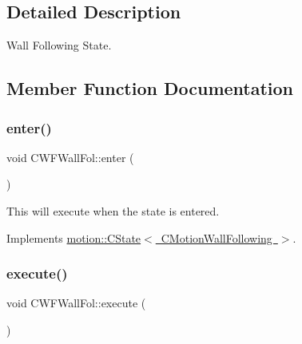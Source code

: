 \subsection{Detailed Description}
Wall Following State. 

\subsection{Member Function Documentation}
\mbox{\label{classmotion_1_1CWFWallFol_a4d0e6d05a5bc89c690f86559cbc55ecb}} 
\subsubsection{\texorpdfstring{enter()}{enter()}}
{\footnotesize\ttfamily void C\+W\+F\+Wall\+Fol\+::enter (\begin{DoxyParamCaption}\item[{\mbox{\hyperlink{classmotion_1_1CMotionWallFollowing}{C\+Motion\+Wall\+Following}} $\ast$}]{ }\end{DoxyParamCaption})\hspace{0.3cm}{\ttfamily [virtual]}}

This will execute when the state is entered. 

Implements \mbox{\hyperlink{classmotion_1_1CState_a53d5fcfec223b58ccdd364a8430fd23c}{motion\+::\+C\+State$<$ C\+Motion\+Wall\+Following $>$}}.

\mbox{\label{classmotion_1_1CWFWallFol_a089095864c2340123e6e5e5e4e08ef23}} 
\subsubsection{\texorpdfstring{execute()}{execute()}}
{\footnotesize\ttfamily void C\+W\+F\+Wall\+Fol\+::execute (\begin{DoxyParamCaption}\item[{\mbox{\hyperlink{classmotion_1_1CMotionWallFollowing}{C\+Motion\+Wall\+Following}} $\ast$}]{ }\end{DoxyParamCaption})\hspace{0.3cm}{\ttfamily [virtual]}}

